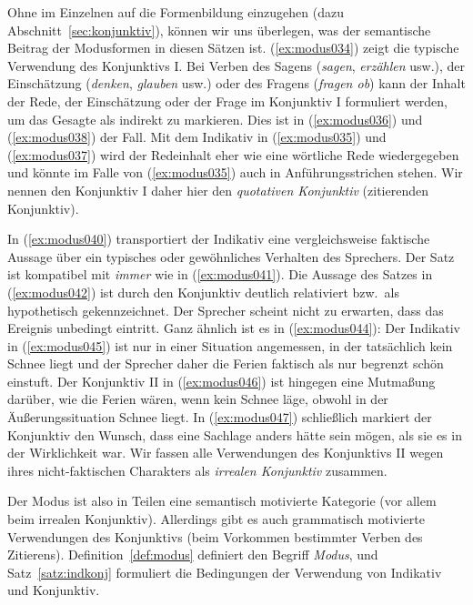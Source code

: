 \Stretch

Ohne im Einzelnen auf die Formenbildung einzugehen (dazu Abschnitt~\ref{sec:konjunktiv}), können wir uns überlegen, was der semantische Beitrag der Modusformen in diesen Sätzen ist.
(\ref{ex:modus034}) zeigt die typische Verwendung des Konjunktivs I.
Bei Verben des Sagens (\textit{sagen}, \textit{erzählen} usw.), der Einschätzung (\textit{denken}, \textit{glauben} usw.) oder des Fragens (\textit{fragen ob}) kann der Inhalt der Rede, der Einschätzung oder der Frage im Konjunktiv I formuliert werden, um das Gesagte als indirekt zu markieren.
Dies ist in (\ref{ex:modus036}) und (\ref{ex:modus038}) der Fall.
Mit dem Indikativ in (\ref{ex:modus035}) und (\ref{ex:modus037}) wird der Redeinhalt eher wie eine wörtliche Rede wiedergegeben und könnte im Falle von (\ref{ex:modus035}) auch in Anführungsstrichen stehen.
Wir nennen den Konjunktiv I daher hier den \textit{quotativen Konjunktiv} (zitierenden Konjunktiv).

In (\ref{ex:modus040}) transportiert der Indikativ eine vergleichsweise faktische Aussage über ein typisches oder gewöhnliches Verhalten des Sprechers.
Der Satz ist kompatibel mit \textit{immer} wie in (\ref{ex:modus041}).
Die Aussage des Satzes in (\ref{ex:modus042}) ist durch den Konjunktiv deutlich relativiert bzw.\ als hypothetisch gekennzeichnet.
Der Sprecher scheint nicht zu erwarten, dass das Ereignis unbedingt eintritt.
Ganz ähnlich ist es in (\ref{ex:modus044}):
Der Indikativ in (\ref{ex:modus045}) ist nur in einer Situation angemessen, in der tatsächlich kein Schnee liegt und der Sprecher daher die Ferien faktisch als nur begrenzt schön einstuft.
Der Konjunktiv II in (\ref{ex:modus046}) ist hingegen eine Mutmaßung darüber, wie die Ferien wären, wenn kein Schnee läge, obwohl in der Äußerungssituation Schnee liegt.
In (\ref{ex:modus047}) schließlich markiert der Konjunktiv den Wunsch, dass eine Sachlage anders hätte sein mögen, als sie es in der Wirklichkeit war.
Wir fassen alle Verwendungen des Konjunktivs II wegen ihres nicht-faktischen Charakters als \textit{irrealen Konjunktiv} zusammen.

Der Modus ist also in Teilen eine semantisch motivierte Kategorie (vor allem beim irrealen Konjunktiv).
Allerdings gibt es auch grammatisch motivierte Verwendungen des Konjunktivs (beim Vorkommen bestimmter Verben des Zitierens).
Definition~\ref{def:modus} definiert den Begriff \textit{Modus}, und Satz~\ref{satz:indkonj} formuliert die Bedingungen der Verwendung von Indikativ und Konjunktiv.

